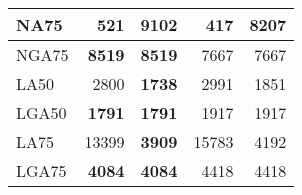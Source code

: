 \documentclass[12pt,a4paper]{article}
\begin{document}
\begin{table}[ht]
\begin{center}
\begin{tabular}{|l*{4}{|r}|}
NA75 & 521 & {\bf 9102} & 417 & 8207 \\ \hline
NGA75 & {\bf 8519} & {\bf 8519} & 7667 & 7667 \\ \hline
LA50 & 2800 & {\bf 1738} & 2991 & 1851 \\ \hline
LGA50 & {\bf 1791} & {\bf 1791} & 1917 & 1917 \\ \hline
LA75 & 13399 & {\bf 3909} & 15783 & 4192 \\ \hline
LGA75 & {\bf 4084} & {\bf 4084} & 4418 & 4418 \\ \hline
\end{tabular}
\end{center}
\end{table}
\end{document}
